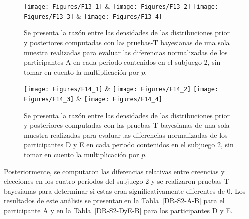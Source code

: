 \begin{figure}[hp]
\centering
\texttt{[image: Figures/F13\_1]} & \texttt{[image: Figures/F13\_2]} 
\texttt{[image: Figures/F13\_3]} & \texttt{[image: Figures/F13\_4]} 
\decoRule
\caption[Evaluación de las Diferencias Relativas entre creencias y elecciones en el Subjuego 1 sin la multiplicación por p (Factor de Bayes)]{Se presenta la razón entre las densidades de las distribuciones prior y posteriores  computadas con las pruebas-T bayesianas de una sola muestra realizadas para evaluar las diferencias normalizadas de los participantes A en cada periodo contenidos en el subjuego 2, sin tomar en cuento la multiplicación por $p$.}
\label{fig:DNnop_S2_A}
\end{figure}  


\begin{figure}[hp]
\centering
\texttt{[image: Figures/F14\_1]} & \texttt{[image: Figures/F14\_2]} 
\texttt{[image: Figures/F14\_3]} & \texttt{[image: Figures/F14\_4]} 
\decoRule
\caption[Evaluación de las Diferencias Relativas entre creencias y elecciones en el Subjuego 1 sin la multiplicación por p (Factor de Bayes)]{Se presenta la razón entre las densidades de las distribuciones prior y posteriores  computadas con las pruebas-T bayesianas de una sola muestra realizadas para evaluar las diferencias normalizadas de los participantes D y E en cada periodo contenidos en el subjuego 2, sin tomar en cuento la multiplicación por $p$.}
\label{fig:DNnop_S2_DyE}
\end{figure}  

Posteriormente, se computaron las diferencias relativas entre creencias y elecciones en los cuatro periodos del subjuego 2 y se realizaron pruebas-T bayesianas para determinar si estas eran significativamente diferentes de 0. Los resultados de este análisis se presentan en la Tabla~\ref{DR-S2-A-B} para el participante A y en la Tabla~\ref{DR-S2-DyE-B} para los participantes D y E.\\

